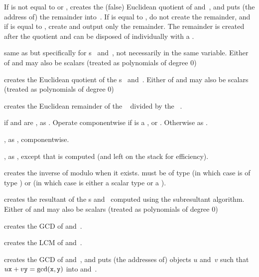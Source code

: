  If  is not equal to
 or , creates the (false) Euclidean quotient of
 and~, and puts (the address of) the remainder into~.
If  is equal to , do not create the remainder, and if
 is equal to , create and output only the remainder.
The remainder is created after the quotient and can be disposed of
individually with a .

 same as  but
specifically for s~ and~, not necessarily in the same
variable. Either of  and  may also be scalars (treated as
polynomials of degree $0$)

 creates the Euclidean quotient of the
s~ and~. Either of  and  may also be
scalars (treated as polynomials of degree $0$)

 creates the Euclidean remainder of the
~ divided by the ~.

 if  and  are ,
as . Operate componentwise if  is
a ,  or . Otherwise as .

, as ,
componentwise.

, as , except that
 is computed (and left on the stack for efficiency).

 creates the inverse of  modulo 
when it exists.  must be of type  (in which case  is
of type ) or  (in which case  is either a scalar
type or a ).


 creates the resultant of the s
 and~ computed using the subresultant algorithm. Either of
 and  may also be scalars (treated as polynomials of degree
$0$)

 creates the GCD of  and~.

 creates the LCM of  and~.

 creates the GCD of 
and~, and puts (the addresses of) objects $u$ and~$v$ such that
$u{\tt x}+v{\tt y}={\rm gcd}({\tt x},{\tt y})$ into  and~.

